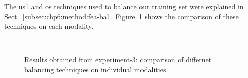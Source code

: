 The \ac{us1} and \ac{os} techniques used to balance our training set were explained in Sect.~\ref{subsec:chp6:method:fea-bal}.
Figure~\ref{fig:res-Ex3-bal} shows the comparison of these techniques on each modality. 
\begin{figure}
  \hspace*{\fill}
  \hfill
  \hspace*{\fill} \\
  \hspace*{\fill}
  \hfill
  \hspace*{\fill}
  \caption[Results obtained from experiment-3: balancing techniques.]{Results obtained from experiment-3: comparison of differnet balancing techniques on individual modalities}
  \label{fig:res-Ex3-bal}
\end{figure}

